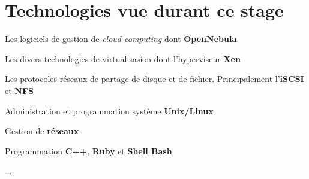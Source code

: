 \section*{Technologies vue durant ce stage}
\begin{listi}
	\item Les logiciels de gestion de \emph{cloud computing} dont \textbf{OpenNebula}\\
	\item Les divers technologies de virtualisasion dont l'hyperviseur \textbf{Xen}\\
	\item Les protocoles réseaux de partage de disque et de fichier. Principalement l'\textbf{iSCSI} et \textbf{NFS}\\
	\item Administration et programmation système \textbf{Unix/Linux}\\
	\item Gestion de \textbf{réseaux}\\
	\item Programmation \textbf{C++}, \textbf{Ruby} et \textbf{Shell Bash}\\
	\item ...
\end{listi}

